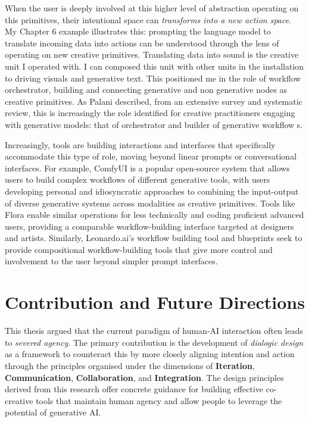 When the user is deeply involved at this higher level of abstraction operating on this primitives, their intentional space can \textit{transforms into a new action space}. My Chapter 6 example illustrates this: prompting the language model to translate incoming data into actions can be understood through the lens of operating on new creative primitives. Translating data into sound is the creative unit I operated with. I can composed this unit with other units in the installation to driving visuals and generative text. This positioned me in the role of workflow orchestrator, building and connecting generative and non generative nodes as creative primitives. As Palani described, from an extensive survey and systematic review, this is increasingly the role identified for creative practitioners engaging with generative models: that of orchestrator and builder of generative workflow \cite{Palani2024-on}s. 

Increasingly, tools are building interactions and interfaces that specifically accommodate this type of role, moving beyond linear prompts or conversational interfaces. For example, ComfyUI is a popular open-source system that allows users to build complex workflows of different generative tools, with users developing personal and idiosyncratic approaches to combining the input-output of diverse generative systems across modalities as creative primitives. Tools like Flora enable similar operations for less technically and coding proficient advanced users, providing a comparable workflow-building interface targeted at designers and artists. Similarly, Leonardo.ai's workflow building tool and blueprints seek to provide compositional workflow-building tools that give more control and involvement to the user beyond simpler prompt interfaces.


\section{Contribution and Future Directions}
This thesis argued that the current paradigm of human-AI interaction often leads to \textit{severed agency}. The primary contribution is the development of \textit{dialogic design} as a framework to counteract this by more closely aligning intention and action through the principles organised under the dimensions of \textbf{Iteration}, \textbf{Communication}, \textbf{Collaboration}, and \textbf{Integration}. The design principles derived from this research offer concrete guidance for building effective co-creative tools that maintain human agency and allow people to leverage the potential of generative AI.

